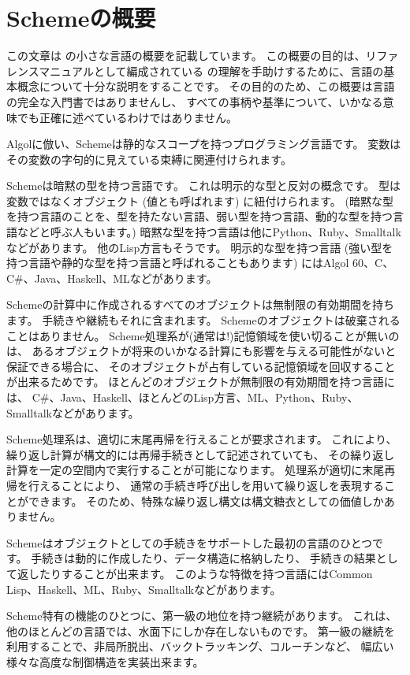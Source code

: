 \chapter*{Schemeの概要}

この文章は \rsevenrs の小さな言語の概要を記載しています。
この概要の目的は、リファレンスマニュアルとして編成されている
\rsevenrs{} の理解を手助けするために、言語の基本概念について十分な説明をすることです。
その目的のため、この概要は言語の完全な入門書ではありませんし、
すべての事柄や基準について、いかなる意味でも正確に述べているわけではありません。

\vest Algolに倣い、Schemeは静的なスコープを持つプログラミング言語です。
変数はその変数の字句的に見えている束縛に関連付けられます。

\vest Schemeは暗黙の型を持つ言語です。
これは明示的な型と反対の概念です。
型は変数ではなくオブジェクト (値とも呼ばれます) に紐付けられます。
(暗黙な型を持つ言語のことを、型を持たない言語、弱い型を持つ言語、動的な型を持つ言語などと呼ぶ人もいます。)
暗黙な型を持つ言語は他にPython、Ruby、Smalltalkなどがあります。
他のLisp方言もそうです。
明示的な型を持つ言語
(強い型を持つ言語や静的な型を持つ言語と呼ばれることもあります)
にはAlgol 60、C、C\#、Java、Haskell、MLなどがあります。

\vest Schemeの計算中に作成されるすべてのオブジェクトは無制限の有効期間を持ちます。
手続きや継続もそれに含まれます。
Schemeのオブジェクトは破棄されることはありません。
Scheme処理系が(通常は!)記憶領域を使い切ることが無いのは、
あるオブジェクトが将来のいかなる計算にも影響を与える可能性がないと保証できる場合に、
そのオブジェクトが占有している記憶領域を回収することが出来るためです。
ほとんどのオブジェクトが無制限の有効期間を持つ言語には、
C\#、Java、Haskell、ほとんどのLisp方言、ML、Python、Ruby、Smalltalkなどがあります。

Scheme処理系は、適切に末尾再帰を行えることが要求されます。
これにより、繰り返し計算が構文的には再帰手続きとして記述されていても、
その繰り返し計算を一定の空間内で実行することが可能になります。
処理系が適切に末尾再帰を行えることにより、
通常の手続き呼び出しを用いて繰り返しを表現することができます。
そのため、特殊な繰り返し構文は構文糖衣としての価値しかありません。

\vest Schemeはオブジェクトとしての手続きをサポートした最初の言語のひとつです。
手続きは動的に作成したり、データ構造に格納したり、
手続きの結果として返したりすることが出来ます。
このような特徴を持つ言語にはCommon Lisp、Haskell、ML、Ruby、Smalltalkなどがあります。

\vest Scheme特有の機能のひとつに、第一級の地位を持つ継続があります。
これは、他のほとんどの言語では、水面下にしか存在しないものです。
第一級の継続を利用することで、非局所脱出、バックトラッキング、コルーチンなど、
幅広い様々な高度な制御構造を実装出来ます。

